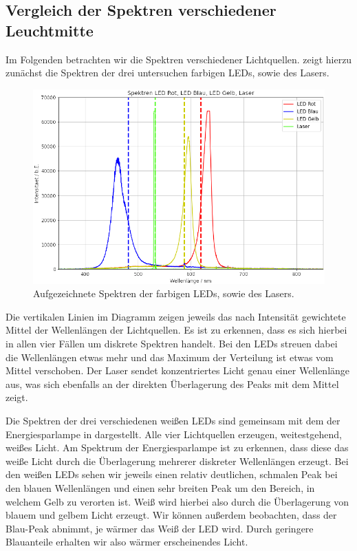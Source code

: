 \newpage

\subsection{Vergleich der Spektren verschiedener Leuchtmitte}

Im Folgenden betrachten wir die Spektren verschiedener Lichtquellen.  zeigt hierzu zunächst die Spektren der drei untersuchen farbigen LEDs, sowie des Lasers.

\begin{figure}[H]
  \centering
  \includegraphics[width=.9\textwidth]{files/plots/led_vergleich.png}
  \caption{Aufgezeichnete Spektren der farbigen LEDs, sowie des Lasers.}
  \label{fig:led_vergleich}
\end{figure}

Die vertikalen Linien im Diagramm zeigen jeweils das nach Intensität gewichtete Mittel der Wellenlängen der Lichtquellen. Es ist zu erkennen, dass es sich hierbei in allen vier Fällen um diskrete Spektren handelt. Bei den LEDs streuen dabei die Wellenlängen etwas mehr und das Maximum der Verteilung ist etwas vom Mittel verschoben. Der Laser sendet konzentriertes Licht genau einer Wellenlänge aus, was sich ebenfalls an der direkten Überlagerung des \glqq{}Peaks\grqq{} mit dem Mittel zeigt.

Die Spektren der drei verschiedenen weißen LEDs sind gemeinsam mit dem der Energiesparlampe in  dargestellt. Alle vier Lichtquellen erzeugen, weitestgehend, weißes Licht. Am Spektrum der Energiesparlampe ist zu erkennen, dass diese das weiße Licht durch die Überlagerung mehrerer diskreter Wellenlängen erzeugt. Bei den weißen LEDs sehen wir jeweils einen relativ deutlichen, schmalen Peak bei den \glqq{}blauen\grqq{} Wellenlängen und einen sehr breiten Peak um den Bereich, in welchem Gelb zu verorten ist. Weiß wird hierbei also durch die Überlagerung von blauem und gelbem Licht erzeugt. Wir können außerdem beobachten, dass der Blau-Peak abnimmt, je \glqq{}wärmer\grqq{} das Weiß der LED wird. Durch geringere Blauanteile erhalten wir also wärmer erscheinendes Licht.

